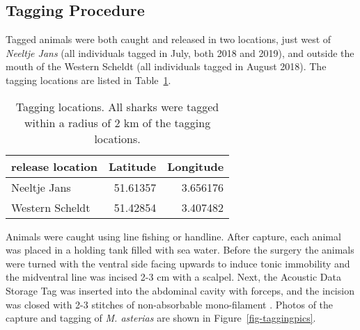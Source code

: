 \documentclass[
  authoryear,
  review,
  3p]{elsarticle}
\begin{document}
\hypertarget{tagging-procedure}{%
\subsection{Tagging Procedure}\label{tagging-procedure}}

Tagged animals were both caught and released in two locations, just west
of \emph{Neeltje Jans} (all individuals tagged in July, both 2018 and
2019), and outside the mouth of the Western Scheldt (all individuals
tagged in August 2018). The tagging locations are listed in
Table~\ref{tbl-releaseloc}.

\hypertarget{tbl-releaseloc}{}
\begin{table}[H]
\caption{\label{tbl-releaseloc}Tagging locations. All sharks were tagged within a radius of 2 km of the
tagging locations. }\tabularnewline

\centering
\begin{tabular}{l|r|r}
\hline
release location & Latitude & Longitude\\
\hline
Neeltje Jans & 51.61357 & 3.656176\\
\hline
Western Scheldt & 51.42854 & 3.407482\\
\hline
\end{tabular}
\end{table}

Animals were caught using line fishing or handline. After capture, each
animal was placed in a holding tank filled with sea water. Before the
surgery the animals were turned with the ventral side facing upwards to
induce tonic immobility \citep{kessel_2015} and the midventral line was
incised 2-3 cm with a scalpel. Next, the Acoustic Data Storage Tag was
inserted into the abdominal cavity with forceps, and the incision was
closed with 2-3 stitches of non-absorbable mono-filament
\citep{goossens_2023}. Photos of the capture and tagging of \emph{M.
asterias} are shown in Figure~\ref{fig-taggingpics}.
\end{document}
